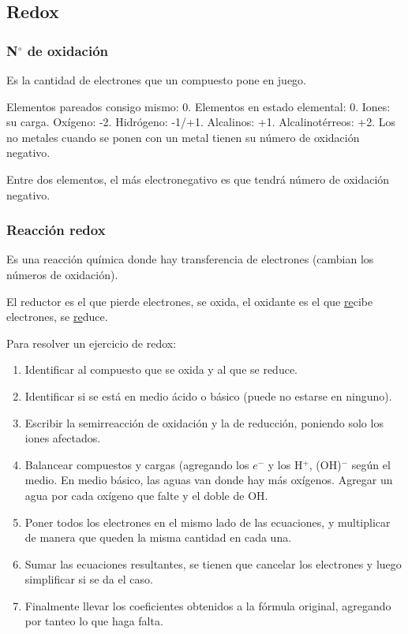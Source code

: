 \subsection{Redox}

\subsubsection*{N$^\circ$ de oxidación}

Es la cantidad de electrones que un compuesto pone en juego.

Elementos pareados consigo mismo: 0. Elementos en estado elemental: 0. Iones: su carga. Oxígeno: -2. Hidrógeno: -1/+1. Alcalinos: +1. Alcalinotérreos: +2. Los no metales cuando se ponen con un metal tienen su número de oxidación negativo.

Entre dos elementos, el más electronegativo es que tendrá número de oxidación negativo.

\subsubsection*{Reacción redox}

Es una reacción química donde hay transferencia de electrones (cambian los números de oxidación).

El reductor es el que pierde electrones, se oxida, el oxidante es el que \underline{re}cibe electrones, se \underline{re}duce.

Para resolver un ejercicio de redox:
\begin{enumerate}[itemsep=0pt, parsep=0.3em, topsep=0.3em]
    \item Identificar al compuesto que se oxida y al que se reduce.
    \item Identificar si se está en medio ácido o básico (puede no estarse en ninguno).
    \item Escribir la semirreacción de oxidación y la de reducción, poniendo solo los iones afectados.
    \item Balancear compuestos y cargas (agregando los $e^-$ y los H$^+$, (OH)$^-$ según el medio. En medio básico, las aguas van donde hay más oxígenos. Agregar un agua por cada oxígeno que falte y el doble de OH.
    \item Poner todos los electrones en el mismo lado de las ecuaciones, y multiplicar de manera que queden la misma cantidad en cada una.
    \item Sumar las ecuaciones resultantes, se tienen que cancelar los electrones y luego simplificar si se da el caso.
    \item Finalmente llevar los coeficientes obtenidos a la fórmula original, agregando por tanteo lo que haga falta.
\end{enumerate}

